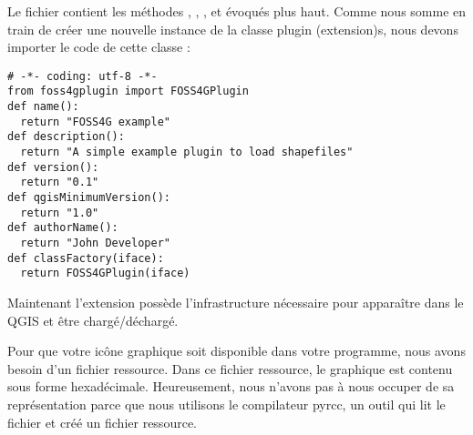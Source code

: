Le fichier  contient les méthodes ,
, , 
et  évoqués plus haut. Comme nous somme en train de créer
une nouvelle instance de la classe plugin (extension)s, nous devons importer le code de cette
classe :

\begin{verbatim}
# -*- coding: utf-8 -*-
from foss4gplugin import FOSS4GPlugin
def name():
  return "FOSS4G example"
def description():
  return "A simple example plugin to load shapefiles"
def version():
  return "0.1"
def qgisMinimumVersion():
  return "1.0"
def authorName():
  return "John Developer"
def classFactory(iface):
  return FOSS4GPlugin(iface)
\end{verbatim}

Maintenant l'extension possède l'infrastructure nécessaire pour apparaître dans le
 QGIS et être
chargé/déchargé.



Pour que votre icône graphique soit disponible dans votre programme, nous avons
besoin d'un fichier ressource. Dans ce fichier ressource, le graphique est
contenu sous forme hexadécimale. Heureusement, nous n'avons pas à nous occuper de
sa représentation parce que nous utilisons le compilateur pyrcc, un outil qui
lit le fichier  et créé un fichier ressource.


